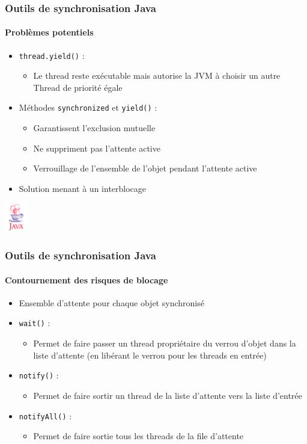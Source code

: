 \begin{frame}
\frametitle{Outils de synchronisation Java}
\framesubtitle{Problèmes potentiels}
\begin{itemize}
\item \texttt{thread.yield()} :
\begin{itemize}
\item Le thread reste exécutable mais autorise la JVM à choisir un autre Thread de priorité égale
\end{itemize}
\item Méthodes \texttt{synchronized} et \texttt{yield()} :
\begin{itemize}
\item Garantissent l’exclusion mutuelle
\item Ne suppriment pas l’attente active
\item Verrouillage de l’ensemble de l’objet pendant l’attente active
\end{itemize}
\item Solution menant à un interblocage
\end{itemize}
\begin{flushright}
\includegraphics[width=1cm]{../illustration/java.png}
\end{flushright}
\end{frame}

\begin{frame}
\frametitle{Outils de synchronisation Java}
\framesubtitle{Contournement des risques de blocage}
\begin{itemize}
\item Ensemble d’attente pour chaque objet synchronisé
\item \texttt{wait()} :
\begin{itemize}
\item Permet de faire passer un thread propriétaire du verrou d’objet dans la liste d’attente (en libérant le verrou pour les threads en entrée)
\end{itemize}
\item \texttt{notify()} :
\begin{itemize}
\item Permet de faire sortir un thread de la liste d’attente vers la liste d’entrée
\end{itemize}
\item \texttt{notifyAll()} :
\begin{itemize}
\item Permet de faire sortie tous les threads de la file d’attente
\end{itemize}
\end{itemize}
\end{frame}

